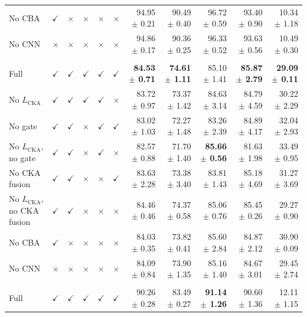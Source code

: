 \documentclass[10pt]{article}
\begin{document}
{\begin{longtable}{lccccc rrrrr}
No CBA & $\checkmark$ & $\times$ & $\times$ & $\times$ & $\times$ & 94.95 $\pm$ 0.21 & 90.49 $\pm$ 0.40 & 96.72 $\pm$ 0.59 & 93.40 $\pm$ 0.90 & 10.34 $\pm$ 1.18 \\
No CNN & $\times$ & $\times$ & $\times$ & $\times$ & $\times$ & 94.86 $\pm$ 0.17 & 90.36 $\pm$ 0.25 & 96.33 $\pm$ 0.52 & 93.63 $\pm$ 0.56 & 10.49 $\pm$ 0.30 \\
\addlinespace[4pt]
\multicolumn{11}{l}{\textit{Source: OTU $\rightarrow$ Target: USOVA}} \\
\midrule
Full & $\checkmark$ & $\checkmark$ & $\checkmark$ & $\checkmark$ & $\checkmark$ & \textbf{84.53 $\pm$ 0.71} & \textbf{74.61 $\pm$ 1.11} & 85.10 $\pm$ 1.41 & \textbf{85.87 $\pm$ 2.79} & \textbf{29.09 $\pm$ 0.11} \\
No $L_{\mathrm{CKA}}$ & $\checkmark$ & $\checkmark$ & $\checkmark$ & $\checkmark$ & $\times$ & 83.72 $\pm$ 0.97 & 73.37 $\pm$ 1.42 & 84.63 $\pm$ 3.14 & 84.79 $\pm$ 4.59 & 30.22 $\pm$ 2.29 \\
No gate & $\checkmark$ & $\checkmark$ & $\times$ & $\checkmark$ & $\checkmark$ & 83.02 $\pm$ 1.03 & 72.27 $\pm$ 1.48 & 83.26 $\pm$ 2.39 & 84.89 $\pm$ 4.17 & 32.04 $\pm$ 2.93 \\
No $L_{\mathrm{CKA}}$, no gate & $\checkmark$ & $\checkmark$ & $\times$ & $\checkmark$ & $\times$ & 82.57 $\pm$ 0.88 & 71.70 $\pm$ 1.40 & \textbf{85.66 $\pm$ 0.56} & 81.63 $\pm$ 1.98 & 33.49 $\pm$ 0.95 \\
No CKA fusion & $\checkmark$ & $\checkmark$ & $\times$ & $\times$ & $\checkmark$ & 83.63 $\pm$ 2.28 & 73.38 $\pm$ 3.40 & 83.81 $\pm$ 1.43 & 85.18 $\pm$ 4.69 & 31.27 $\pm$ 3.69 \\
No $L_{\mathrm{CKA}}$, no CKA fusion & $\checkmark$ & $\checkmark$ & $\times$ & $\times$ & $\times$ & 84.46 $\pm$ 0.46 & 74.37 $\pm$ 0.58 & 85.06 $\pm$ 0.76 & 85.45 $\pm$ 0.26 & 29.27 $\pm$ 0.90 \\
No CBA & $\checkmark$ & $\times$ & $\times$ & $\times$ & $\times$ & 84.03 $\pm$ 0.35 & 73.82 $\pm$ 0.41 & 85.60 $\pm$ 2.84 & 84.87 $\pm$ 2.12 & 30.90 $\pm$ 0.09 \\
No CNN & $\times$ & $\times$ & $\times$ & $\times$ & $\times$ & 84.09 $\pm$ 0.84 & 73.90 $\pm$ 1.35 & 85.16 $\pm$ 1.40 & 84.67 $\pm$ 3.01 & 29.45 $\pm$ 2.74 \\
\addlinespace[4pt]
\multicolumn{11}{l}{\textit{Source: OVATUS $\rightarrow$ Target: OTU}} \\
\midrule
Full & $\checkmark$ & $\checkmark$ & $\checkmark$ & $\checkmark$ & $\checkmark$ & 90.26 $\pm$ 0.28 & 83.49 $\pm$ 0.27 & \textbf{91.14 $\pm$ 1.26} & 90.60 $\pm$ 1.36 & 12.11 $\pm$ 1.15 \\

\end{longtable}}
\end{document}
